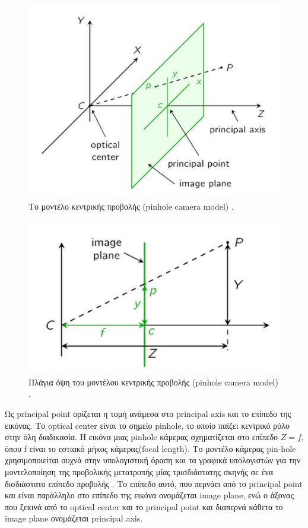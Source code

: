 \begin{figure}[H]
    \centering
    \includegraphics[scale=0.5, angle=0]{Files/Figures/pinhole1.png}
    \caption[Το μοντέλο κεντρικής προβολής στις 3 διαστάσεις (pinhole camera model)]{ Το μοντέλο κεντρικής προβολής (pinhole camera model) \cite{pinhole} .}
    \label{fig:pinhole1}
\end{figure}


\begin{figure}[H]
    \centering
    \includegraphics[scale=0.5, angle=0]{Files/Figures/pinhole2.png}
    \caption[Πλάγια όψη του μοντέλου κεντρικής προβολής 2D (pinhole camera model)]{ Πλάγια όψη του μοντέλου κεντρικής προβολής (pinhole camera model) \cite{pinhole} .}
    \label{fig:pinhole2}
\end{figure}

Ως principal point ορίζεται η τομή ανάμεσα στο principal axis και το επίπεδο της εικόνας. Το optical center είναι το σημείο pinhole, το οποίο παίζει κεντρικό ρόλο στην όλη διαδικασία. Η εικόνα μιας pinhole κάμερας σχηματίζεται στο επίπεδο $Z=f$, όπου f είναι το εστιακό μήκος κάμερας(focal length).
Το μοντέλο κάμερας pin-hole χρησιμοποιείται συχνά στην υπολογιστική όραση και τα γραφικά υπολογιστών για την μοντελοποίηση της προβολικής μετατροπής μίας τρισδιάστατης σκηνής σε ένα δισδιάστατο επίπεδο προβολής \cite{hartley2003multiple} .
Το επίπεδο αυτό, που περνάει από το principal point και είναι παράλληλο στο επίπεδο της εικόνα ονομάζεται image plane, ενώ ο άξονας που ξεκινά από το optical center και το principal point και διαπερνά κάθετα το image plane ονομάζεται principal axis.


